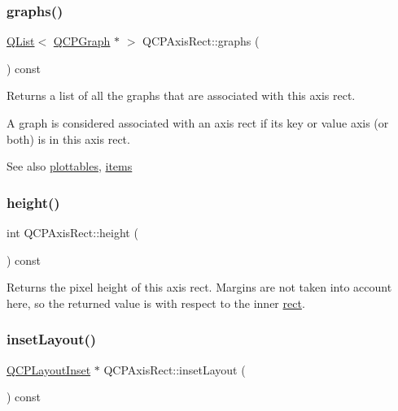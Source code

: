 \subsubsection{\texorpdfstring{graphs()}{graphs()}}
{\footnotesize\ttfamily \hyperlink{class_q_list}{Q\+List}$<$ \hyperlink{class_q_c_p_graph}{Q\+C\+P\+Graph} $\ast$ $>$ Q\+C\+P\+Axis\+Rect\+::graphs (\begin{DoxyParamCaption}{ }\end{DoxyParamCaption}) const}

Returns a list of all the graphs that are associated with this axis rect.

A graph is considered associated with an axis rect if its key or value axis (or both) is in this axis rect.

\begin{DoxySeeAlso}{See also}
\hyperlink{class_q_c_p_axis_rect_a587d073a97b27bc7293fab4b2774ad59}{plottables}, \hyperlink{class_q_c_p_axis_rect_a03c113a2175448300ee8f944e24776ba}{items} 
\end{DoxySeeAlso}
\mbox{\label{class_q_c_p_axis_rect_acc4377809e79d9a089ab790f39429b0d}} 
\subsubsection{\texorpdfstring{height()}{height()}}
{\footnotesize\ttfamily int Q\+C\+P\+Axis\+Rect\+::height (\begin{DoxyParamCaption}{ }\end{DoxyParamCaption}) const\hspace{0.3cm}{\ttfamily [inline]}}

Returns the pixel height of this axis rect. Margins are not taken into account here, so the returned value is with respect to the inner \hyperlink{class_q_c_p_layout_element_a208effccfe2cca4a0eaf9393e60f2dd4}{rect}. \mbox{\label{class_q_c_p_axis_rect_a949f803466619924c7018df4b511ae10}} 
\subsubsection{\texorpdfstring{inset\+Layout()}{insetLayout()}}
{\footnotesize\ttfamily \hyperlink{class_q_c_p_layout_inset}{Q\+C\+P\+Layout\+Inset} $\ast$ Q\+C\+P\+Axis\+Rect\+::inset\+Layout (\begin{DoxyParamCaption}{ }\end{DoxyParamCaption}) const\hspace{0.3cm}{\ttfamily [inline]}}

